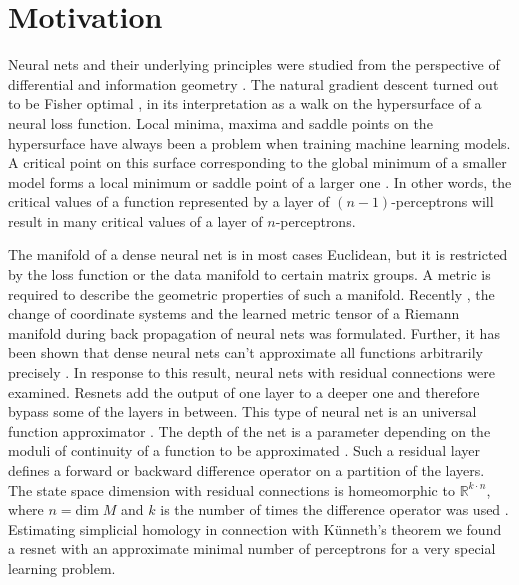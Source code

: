 \documentclass[envcountsect,runningheads]{llncs}
\begin{document}
\section{Motivation}
Neural nets and their underlying principles were studied from the perspective of differential and information geometry . The natural gradient descent turned out to be Fisher optimal , in its interpretation as a walk on the hypersurface of a neural loss function. Local minima, maxima and saddle points on the hypersurface have always been a problem when training machine learning models. A critical point on this surface corresponding to the global minimum of a smaller model forms a local minimum or saddle point of a larger one . In other words, the critical values of a function represented by a layer of $(n-1)$-perceptrons will result in many critical values of a layer of $n$-perceptrons.

The manifold of a dense neural net is in most cases Euclidean, but it is restricted by the loss function or the data manifold to certain matrix groups. A metric is required to describe the geometric properties of such a manifold. Recently , the change of coordinate systems and the learned metric tensor of a Riemann manifold during back propagation of neural nets was formulated. Further, it has been shown that dense neural nets can't approximate all functions arbitrarily precisely . In response to this result, neural nets with residual connections were examined. Resnets add the output of one layer to a deeper one and therefore bypass some of the layers in between. This type of neural net is an universal function approximator . The depth of the net is a parameter depending on the moduli of continuity of a function to be approximated . Such a residual layer defines a forward or backward difference operator on a partition of the layers. The state space dimension with residual connections is homeomorphic to $\mathbb{R}^{k \cdot n}$, where $n = \text{dim} \; M$ and $k$ is the number of times the difference operator was used . Estimating simplicial homology in connection with Künneth's theorem we found a resnet with an approximate minimal number of perceptrons for a very special learning problem.
\end{document}
